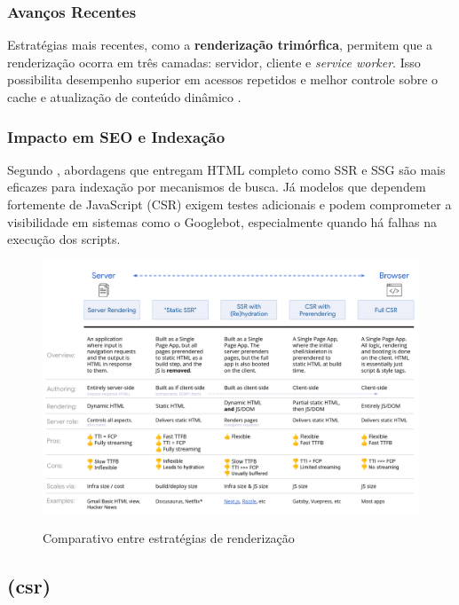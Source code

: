 \subsubsection{Avanços Recentes}

Estratégias mais recentes, como a \textbf{renderização trimórfica}, permitem que a renderização ocorra em três camadas: servidor, cliente e \textit{service worker}. Isso possibilita desempenho superior em acessos repetidos e melhor controle sobre o cache e atualização de conteúdo dinâmico \cite{osmani2025}.

\subsubsection{Impacto em SEO e Indexação}

Segundo , abordagens que entregam HTML completo como SSR e SSG são mais eficazes para indexação por mecanismos de busca. Já modelos que dependem fortemente de JavaScript (CSR) exigem testes adicionais e podem comprometer a visibilidade em sistemas como o Googlebot, especialmente quando há falhas na execução dos scripts.

\begin{figure}[H]
  \centering
  \caption{Comparativo entre estratégias de renderização}
  \includegraphics[width=\textwidth]{media/rendering_comparison_table.png}
  \label{fig:comparativo_renderizacao}
\end{figure}




\subsection{ (\acrshort{csr})}
\label{subsec:csr}

